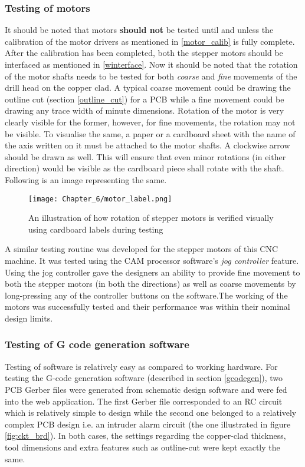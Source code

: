 \subsubsection*{Testing of motors}

It should be noted that motors \textbf{should not} be tested until and unless the calibration of the motor drivers as mentioned in \ref{motor_calib} is fully complete. After the calibration has been completed, both the stepper motors should be interfaced as mentioned in \ref{winterface}. Now it should be noted that the rotation of the motor shafts needs to be tested for both \textit{coarse} and \textit{fine} movements of the drill head on the copper clad. A typical coarse movement could be drawing the outline cut (section \ref{outline_cut}) for a PCB while a fine movement could be drawing any trace width of minute dimensions. Rotation of the motor is very clearly visible for the former, however, for fine movements, the rotation may not be visible. To visualise the same, a paper or a cardboard sheet with the name of the axis written on it must be attached to the motor shafts. A clockwise arrow should be drawn as well. This will ensure that even minor rotations (in either direction) would be visible as the cardboard piece shall rotate with the shaft. Following is an image representing the same. \par

\begin{figure}[h]
 \centering
 \texttt{[image: Chapter\_6/motor\_label.png]}
 \caption{An illustration of how rotation of stepper motors is verified visually using cardboard labels during testing}
 \label{fig:motorlabel}
\end{figure}

A similar testing routine was developed for the stepper motors of this CNC machine. It was tested using the CAM processor software’s \textit{jog controller} feature. Using the jog controller gave the designers an ability to provide fine movement to both the stepper motors (in both the directions) as well as coarse movements by long-pressing any of the controller buttons on the software.The working of the motors was successfully tested and their performance was within their nominal design limits.

\subsubsection*{Testing of G code generation software}

Testing of software is relatively easy as compared to working hardware. For testing the G-code generation software (described in section \ref{gcodegen}), two PCB Gerber files were generated from schematic design software and were fed into the web application. The first Gerber file corresponded to an RC circuit which is relatively simple to design while the second one belonged to a relatively complex PCB design i.e. an intruder alarm circuit (the one illustrated in figure \ref{fig:ckt_brd}). In both cases, the settings regarding the copper-clad thickness, tool dimensions and extra features such as outline-cut were kept exactly the same. \par

